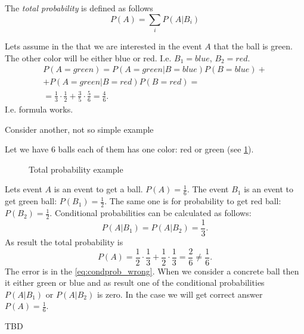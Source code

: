 \begin{proposition}

The \textit{total probability} is defined as follows
\[
P(A) = \sum_i P(A|B_i)
\]
\label{thm:totalprobability}
\end{proposition}

\begin{example}
Lets assume in the  that we are
interested in the event $A$ that the ball is green. The other color
will be either blue or red. I.e. $B_1 = blue$, $B_2 = red$.
\begin{eqnarray}
P(A = green) = P(A = green|B = blue) P(B = blue) +
\nonumber \\
+
P(A = green|B = red) P(B = red) =
\nonumber \\
= \frac{1}{3} \cdot \frac{1}{2} + \frac{3}{5}\cdot \frac{5}{6} = \frac{4}{6}.
\nonumber
\end{eqnarray}
I.e. formula works.
\end{example}

Consider another, not so simple example
\begin{example}
Let we have 6 balls each of them has one color: red or green (see
\cref{fig:excondprobability_add}). 
\begin{figure}[H]
  \centering
  \caption{Total probability example}
  \label{fig:excondprobability_add}
\end{figure}
Lets event $A$ is an event to get a ball. $P(A) = \frac{1}{6}$. The
event $B_1$ is an event to get green ball: $P(B_1) = \frac{1}{2}$. The
same one is for probability to get red ball: $P(B_2) = \frac{1}{2}$.
Conditional probabilities can be calculated as follows:
\begin{equation}
P(A|B_1) = P(A|B_2) = \frac{1}{3}.
\label{eq:condprob_wrong}
\end{equation}
As result the total probability is 
\[
P(A) = \frac{1}{2}\cdot\frac{1}{3} + \frac{1}{2}\cdot\frac{1}{3} =
\frac{2}{6} \ne \frac{1}{6}.
\]
The error is in the \eqref{eq:condprob_wrong}. When we consider a
concrete ball then it either green or blue and as result one of the
conditional probabilities $P(A|B_1)$ or $P(A|B_2)$ is zero. In the
case we will get correct answer $P(A) = \frac{1}{6}$.
\end{example}


TBD \cite{bib:kolmogorov74basic}
